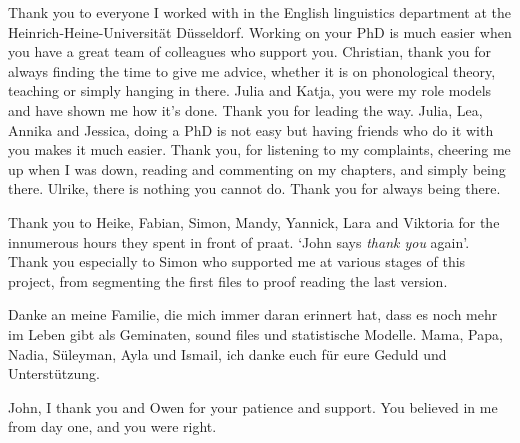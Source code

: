 Thank you to everyone I worked with in the English linguistics department at the Heinrich-Heine-Universität Düsseldorf. Working on your PhD is much easier when you have a great team of colleagues who support you. 
Christian, thank you for always finding the time to give me advice, whether it is on phonological theory, teaching or simply hanging in there. 
Julia and Katja, you were my role models and have shown me how it's done. Thank you for leading the way.
Julia, Lea, Annika and Jessica, doing a PhD is not easy but having friends who do it with you makes it much easier. Thank you, for listening to my complaints, cheering me up when I was down, reading  and commenting on my chapters, and simply being there.
Ulrike, there is nothing you cannot do. Thank you for always being there.

Thank you to Heike, Fabian, Simon, Mandy, Yannick, Lara and Viktoria for the innumerous hours they spent in front of praat. `John says \textit{thank you} again'.  
Thank you especially to Simon who supported me at various stages of this project, from segmenting the first files to proof reading the last version.

Danke an meine Familie, die mich immer daran erinnert hat, dass es noch mehr im Leben gibt als Geminaten, sound files und statistische Modelle. Mama, Papa, Nadia, Süleyman, Ayla und Ismail, ich danke euch für eure Geduld und Unterstützung.

John, I thank you and Owen for your patience and support. You believed in me from day one, and you were right.





